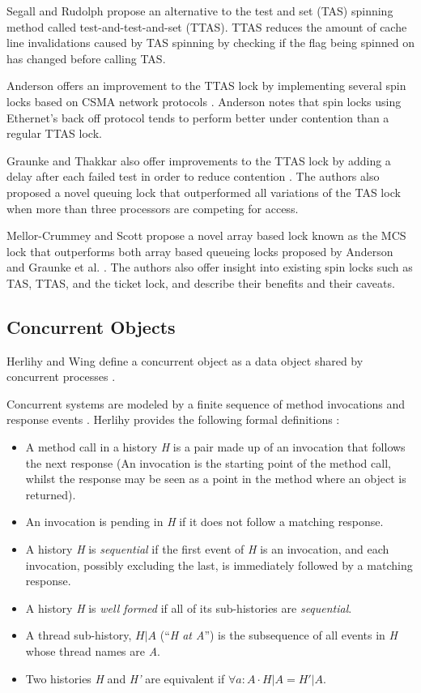 \documentclass[a4paper, 12pt, titlepage]{article}
\begin{document}
\begin{singlespace}
Segall and Rudolph \cite{rudolph1984dynamic} propose an alternative to the test and set (TAS) spinning method called test-and-test-and-set (TTAS). TTAS reduces the amount of cache line invalidations caused by TAS spinning by checking if the flag being spinned on has changed before calling TAS.

Anderson offers an improvement to the TTAS lock by implementing several spin locks based on CSMA network protocols \cite{anderson1990performance}. Anderson notes that spin locks using Ethernet's back off protocol tends to perform better under contention than a regular TTAS lock.

Graunke and Thakkar also offer improvements to the TTAS lock by adding a delay after each failed test in order to reduce contention \cite{graunke1990synchronization}. The authors also proposed a novel queuing lock that outperformed all variations of the TAS lock when more than three processors are competing for access.

Mellor-Crummey and Scott propose a novel array based lock known as the MCS lock that outperforms both array based queueing locks proposed by Anderson and Graunke et al. \cite{mellor1991algorithms}. The authors also offer insight into existing spin locks such as TAS, TTAS, and the ticket lock, and describe their benefits and their caveats.
\subsection{Concurrent Objects}
Herlihy and Wing define a concurrent object as a data object shared by concurrent processes \cite{herlihy1990linearizability}. 

Concurrent systems are modeled by a finite sequence of method invocations and response events \cite[Chapter~3.6]{herlihy2020art}. Herlihy provides the following formal definitions \cite[Chapter~3.6]{herlihy2020art}:
\begin{itemize}
  \item A method call in a history \emph{H} is a pair made up of an invocation that follows the next response (An invocation is the starting point of the method call, whilst the response may be seen as a point in the method where an object is returned).
  \item An invocation is pending in \emph{H} if it does not follow a matching response.
  \item A history \emph{H} is \emph{sequential} if the first event of \emph{H} is an invocation, and each invocation, possibly excluding the last, is immediately followed by a matching response.
  \item A history \emph{H} is \emph{well formed} if all of its sub-histories are \emph{sequential}.
  \item A thread sub-history, $H|A$  (``\emph{H at A}'') is the subsequence of all events in \emph{H} whose thread names are \emph{A}.
  \item Two histories \emph{H} and \emph{H'} are equivalent if $\forall a:A \cdot H|A = H'|A$.
\end{itemize}


\end{singlespace}
\end{document}
